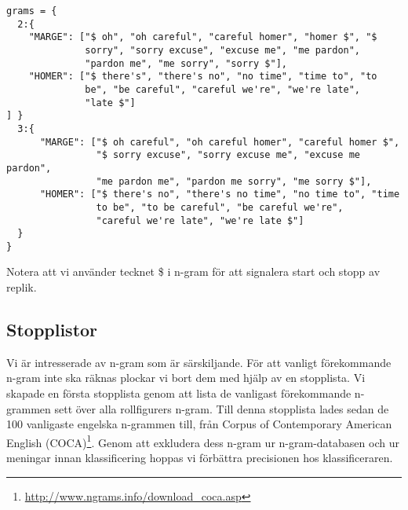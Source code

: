 \documentclass[a4paper]{article}
\begin{document}


\begin{verbatim}
grams = {
  2:{
    "MARGE": ["$ oh", "oh careful", "careful homer", "homer $", "$
              sorry", "sorry excuse", "excuse me", "me pardon",
              "pardon me", "me sorry", "sorry $"],
    "HOMER": ["$ there's", "there's no", "no time", "time to", "to
              be", "be careful", "careful we're", "we're late",
              "late $"]
] }
  3:{
      "MARGE": ["$ oh careful", "oh careful homer", "careful homer $",
                "$ sorry excuse", "sorry excuse me", "excuse me pardon",
                "me pardon me", "pardon me sorry", "me sorry $"],
      "HOMER": ["$ there's no", "there's no time", "no time to", "time
                to be", "to be careful", "be careful we're",
                "careful we're late", "we're late $"]
  }
}
\end{verbatim}
Notera att vi använder tecknet \$ i n-gram för att signalera start och
stopp av replik.

\subsection{Stopplistor}
Vi är intresserade av n-gram som är särskiljande. För att vanligt förekommande
n-gram inte ska räknas plockar vi bort dem med hjälp av en stopplista. Vi
skapade en första stopplista genom att lista de vanligast förekommande n-grammen
sett över alla rollfigurers n-gram. Till denna stopplista lades sedan de 100
vanligaste engelska n-grammen till, från Corpus of Contemporary American English
(COCA)\footnote{\url{http://www.ngrams.info/download_coca.asp}}. Genom att
exkludera dess n-gram ur n-gram-databasen och ur meningar innan klassificering
hoppas vi förbättra precisionen hos klassificeraren.
\end{document}
